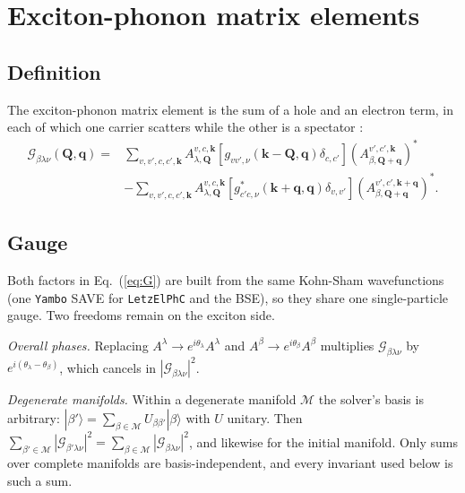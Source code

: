 \documentclass[10pt,a4paper]{article}
\newcommand{\G}{\mathcal{G}}
\newcommand{\bq}{\mathbf{q}}
\newcommand{\bQ}{\mathbf{Q}}
\newcommand{\bk}{\mathbf{k}}
\begin{document}
\section{Exciton-phonon matrix elements}
\label{sec:excph}

\subsection{Definition}
The exciton-phonon matrix element is the sum of a hole and an electron term, in
each of which one carrier scatters while the other is a spectator
\cite{Antonius2022,Chen2020}:
\begin{equation}
\begin{split}
\G_{\beta\lambda\nu}\!\left(\bQ,\bq\right) ={}&
\sum_{v,v',c,c',\bk}
A_{\lambda,\bQ}^{v,c,\bk}
\!\left[g_{vv',\nu}\!\left(\bk-\bQ,\bq\right)\delta_{c,c'}\right]
\left(A_{\beta,\bQ+\bq}^{v',c',\bk}\right)^{\ast}\\
&-\sum_{v,v',c,c',\bk}
A_{\lambda,\bQ}^{v,c,\bk}
\!\left[g_{c'c,\nu}^{\ast}\!\left(\bk+\bq,\bq\right)\delta_{v,v'}\right]
\left(A_{\beta,\bQ+\bq}^{v',c',\bk+\bq}\right)^{\ast}.
\end{split}
\label{eq:G}
\end{equation}

\subsection{Gauge}
Both factors in Eq.~(\ref{eq:G}) are built from the same Kohn-Sham wavefunctions
(one \texttt{Yambo} SAVE for \texttt{LetzElPhC} and the BSE), so they share one
single-particle gauge. Two freedoms remain on the exciton side.

\emph{Overall phases.} Replacing $A^{\lambda}\to e^{i\theta_\lambda}A^\lambda$ and
$A^{\beta}\to e^{i\theta_\beta}A^\beta$ multiplies $\G_{\beta\lambda\nu}$ by
$e^{i(\theta_\lambda-\theta_\beta)}$, which cancels in $|\G_{\beta\lambda\nu}|^2$.

\emph{Degenerate manifolds.} Within a degenerate manifold $\mathcal{M}$ the
solver's basis is arbitrary: $|\beta'\rangle=\sum_{\beta\in\mathcal{M}}U_{\beta\beta'}|\beta\rangle$
with $U$ unitary. Then $\sum_{\beta'\in\mathcal{M}}|\G_{\beta'\lambda\nu}|^2=\sum_{\beta\in\mathcal{M}}|\G_{\beta\lambda\nu}|^2$,
and likewise for the initial manifold. Only sums over complete manifolds are
basis-independent, and every invariant used below is such a sum.
\end{document}
